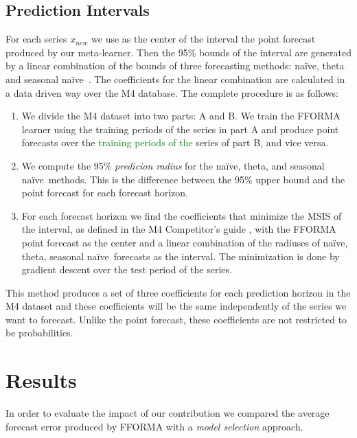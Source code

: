 \documentclass[11pt,a4paper,]{article}
\def\naive{na\"{i}ve}
\theoremstyle{definition}
\theoremstyle{definition}
\theoremstyle{definition}
\theoremstyle{remark}
\begin{document}
\subsection{Prediction Intervals}\label{prediction-intervals}

For each series \(x_{new}\) we use as the center of the interval the
point forecast produced by our meta-learner. Then the 95\% bounds of the
interval are generated by a linear combination of the bounds of three
forecasting methods: \naive, theta and seasonal \naive~. The
coefficients for the linear combination are calculated in a data driven
way over the M4 database. The complete procedure is as follows:

\begin{enumerate}
\def\labelenumi{\arabic{enumi}.}
\item
  We divide the M4 dataset into two parts: A and B. We train the FFORMA
  learner using the training periods of the series in part A and produce
  point forecasts over the \textcolor{green}{training periods of the}
  series of part B, and vice versa.
\item
  We compute the 95\% \emph{predicion radius} for the \naive, theta, and
  seasonal \naive~methods. This is the difference between the 95\% upper
  bound and the point forecast for each forecast horizon.
\item
  For each forecast horizon we find the coefficients that minimize the
  MSIS of the interval, as defined in the M4 Competitor's guide
  \textcite{M4compguide}, with the FFORMA point forecast as the center
  and a linear combination of the radiuses of \naive, theta, seasonal
  \naive~forecasts as the interval. The minimization is done by gradient
  descent over the test period of the series.
\end{enumerate}

This method produces a set of three coefficients for each prediction
horizon in the M4 dataset and these coefficients will be the same
independently of the series we want to forecast. Unlike the point
forecast, these coefficients are not restricted to be probabilities.

\section{Results}\label{results}

In order to evaluate the impact of our contribution we compared the
average forecast error produced by FFORMA with a \emph{model selection}
approach.
\end{document}
